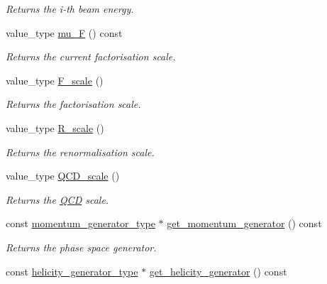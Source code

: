 \begin{DoxyCompactItemize}
\begin{DoxyCompactList}\small\item\em Returns the i-\/th beam energy. \end{DoxyCompactList}\item 
\hypertarget{a00436_aa9339b30978ba9c659986995f50246b9}{}value\+\_\+type \hyperlink{a00436_aa9339b30978ba9c659986995f50246b9}{mu\+\_\+\+F} () const \label{a00436_aa9339b30978ba9c659986995f50246b9}

\begin{DoxyCompactList}\small\item\em Returns the current factorisation scale. \end{DoxyCompactList}\item 
\hypertarget{a00436_a59b6a343a569e528b7696037e66b46c4}{}value\+\_\+type \hyperlink{a00436_a59b6a343a569e528b7696037e66b46c4}{F\+\_\+scale} ()\label{a00436_a59b6a343a569e528b7696037e66b46c4}

\begin{DoxyCompactList}\small\item\em Returns the factorisation scale. \end{DoxyCompactList}\item 
\hypertarget{a00436_a01dcc402f85247beb330b81fb5db1290}{}value\+\_\+type \hyperlink{a00436_a01dcc402f85247beb330b81fb5db1290}{R\+\_\+scale} ()\label{a00436_a01dcc402f85247beb330b81fb5db1290}

\begin{DoxyCompactList}\small\item\em Returns the renormalisation scale. \end{DoxyCompactList}\item 
\hypertarget{a00436_a58d8c637591672f8355c333d774606fc}{}value\+\_\+type \hyperlink{a00436_a58d8c637591672f8355c333d774606fc}{Q\+C\+D\+\_\+scale} ()\label{a00436_a58d8c637591672f8355c333d774606fc}

\begin{DoxyCompactList}\small\item\em Returns the \hyperlink{a00460}{Q\+C\+D} scale. \end{DoxyCompactList}\item 
\hypertarget{a00436_aa59f3d27d4e34e43729a3be22b839a2b}{}const \hyperlink{a00450}{momentum\+\_\+generator\+\_\+type} $\ast$ \hyperlink{a00436_aa59f3d27d4e34e43729a3be22b839a2b}{get\+\_\+momentum\+\_\+generator} () const \label{a00436_aa59f3d27d4e34e43729a3be22b839a2b}

\begin{DoxyCompactList}\small\item\em Returns the phase space generator. \end{DoxyCompactList}\item 
\hypertarget{a00436_ad86eef948e9057c2483c84494be6bfb0}{}const \hyperlink{a00270}{helicity\+\_\+generator\+\_\+type} $\ast$ \hyperlink{a00436_ad86eef948e9057c2483c84494be6bfb0}{get\+\_\+helicity\+\_\+generator} () const \label{a00436_ad86eef948e9057c2483c84494be6bfb0}


\end{DoxyCompactItemize}
